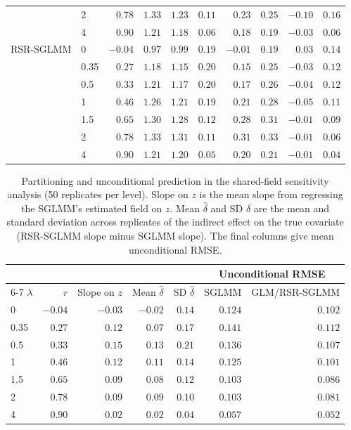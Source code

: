 \begin{table}[ht]
\begin{tabular}{llrrrrrrrr}
 & 2 & $0.78$ & $1.33$ & $1.23$ & $0.11$ & $0.23$ & $0.25$ & $-0.10$ & $0.16$ \\
 & 4 & $0.90$ & $1.21$ & $1.18$ & $0.06$ & $0.18$ & $0.19$ & $-0.03$ & $0.06$ \\
\addlinespace
RSR-SGLMM & 0 & $-0.04$ & $0.97$ & $0.99$ & $0.19$ & $-0.01$ & $0.19$ & $0.03$ & $0.14$ \\
 & 0.35 & $0.27$ & $1.18$ & $1.15$ & $0.20$ & $0.15$ & $0.25$ & $-0.03$ & $0.12$ \\
 & 0.5 & $0.33$ & $1.21$ & $1.17$ & $0.20$ & $0.17$ & $0.26$ & $-0.04$ & $0.12$ \\
 & 1 & $0.46$ & $1.26$ & $1.21$ & $0.19$ & $0.21$ & $0.28$ & $-0.05$ & $0.11$ \\
 & 1.5 & $0.65$ & $1.30$ & $1.28$ & $0.12$ & $0.28$ & $0.31$ & $-0.01$ & $0.09$ \\
 & 2 & $0.78$ & $1.33$ & $1.31$ & $0.11$ & $0.31$ & $0.33$ & $-0.01$ & $0.06$ \\
 & 4 & $0.90$ & $1.21$ & $1.20$ & $0.05$ & $0.20$ & $0.21$ & $-0.01$ & $0.04$ \\
\bottomrule
\end{tabular}
\end{table}

\begin{table}[ht]
\centering
\small
\caption{Partitioning and unconditional prediction in the shared-field sensitivity analysis (50 replicates per level). Slope on $z$ is the mean slope from regressing the SGLMM's estimated field on $z$. Mean $\hat{\delta}$ and SD $\hat{\delta}$ are the mean and standard deviation across replicates of the indirect effect on the true covariate (RSR-SGLMM slope minus SGLMM slope). The final columns give mean unconditional RMSE.}
\label{tab:si_shared_partition}
\begin{tabular}{lrrrrrr}
\toprule
 & & & & & \multicolumn{2}{c}{Unconditional RMSE} \\
\cmidrule(lr){6-7}
$\lambda$ & $r$ & Slope on $z$ & Mean $\hat{\delta}$ & SD $\hat{\delta}$ & SGLMM & GLM/RSR-SGLMM \\
\midrule
0 & $-0.04$ & $-0.03$ & $-0.02$ & $0.14$ & $0.124$ & $0.102$ \\
0.35 & $0.27$ & $0.12$ & $0.07$ & $0.17$ & $0.141$ & $0.112$ \\
0.5 & $0.33$ & $0.15$ & $0.13$ & $0.21$ & $0.136$ & $0.107$ \\
1 & $0.46$ & $0.12$ & $0.11$ & $0.14$ & $0.125$ & $0.101$ \\
1.5 & $0.65$ & $0.09$ & $0.08$ & $0.12$ & $0.103$ & $0.086$ \\
2 & $0.78$ & $0.09$ & $0.09$ & $0.10$ & $0.103$ & $0.081$ \\
4 & $0.90$ & $0.02$ & $0.02$ & $0.04$ & $0.057$ & $0.052$ \\
\bottomrule
\end{tabular}
\end{table}
